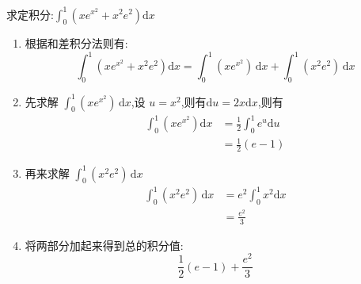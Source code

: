 \documentclass[answers]{exam}
\begin{document}
\begin{questions}
	\question 求定积分:$\int_0^1\left(xe^{x^2} + x^2e^2\right)\mathrm{d}x$
	\begin{solution}
		\begin{enumerate}[label=\arabic*.]
			\item 根据和差积分法则有:
			      \begin{equation*}
				      \int_0^1\left(xe^{x^2} + x^2e^2\right)\mathrm{d}x  = \int_0^1(xe^{x^2})\,\mathrm{d}x + \int_0^1(x^2e^2)\,\mathrm{d}x
			      \end{equation*}
			\item 先求解 $\int_0^1(xe^{x^2})\,\mathrm{d}x $,设 $u=x^2$,则有$\mathrm{d}u=2x\mathrm{d}x$,则有
			      \begin{align*}
				      \int_0^1(xe^{x^2})\mathrm{d}x & = \frac12\int_0^1e^u\mathrm{d}u \\
				                                    & = \frac12(e-1)
			      \end{align*}
			\item 再来求解 $\int_0^1(x^2e^2)\,\mathrm{d}x$
			      \begin{align*}
				      \int_0^1(x^2e^2)\,\mathrm{d}x & = e^2\int_0^1x^2\mathrm{d}x \\
				                                    & = \frac{e^2}{3}
			      \end{align*}
			\item 将两部分加起来得到总的积分值:
			      \begin{equation*}
				      \frac12(e-1) + \frac{e^2}{3}
			      \end{equation*}
		\end{enumerate}
	\end{solution}
\end{questions}
\end{document}
